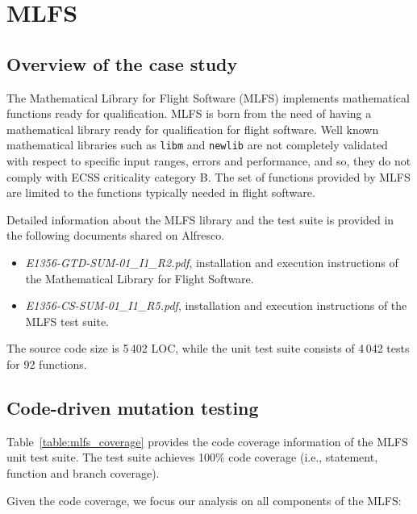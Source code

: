 \clearpage

\section{MLFS}
\label{sec:caseStudies:GSL:MLSF}

\subsection{Overview of the case study}

The Mathematical Library for Flight Software (MLFS) implements mathematical functions ready for qualification. 
MLFS is born from the need of having a mathematical library ready for qualification for flight software. Well known mathematical libraries such as \texttt{libm} and \texttt{newlib} are not completely validated with respect to specific input ranges, errors and performance, and so, they do not comply with ECSS criticality category B.
The set of functions provided by MLFS are limited to the functions typically needed in flight software. 

Detailed information about the MLFS library and the test suite is provided in the following documents shared on Alfresco.

\begin{itemize}
	\item \emph{E1356-GTD-SUM-01\_I1\_R2.pdf}, installation and execution instructions of the Mathematical Library for Flight Software. 
	\item \emph{E1356-CS-SUM-01\_I1\_R5.pdf}, installation and execution instructions of the MLFS test suite.
\end{itemize}

The source code size is 5\,402 LOC, while the unit test suite consists of 4\,042 tests for 92 functions.

\subsection{Code-driven mutation testing}



Table~\ref{table:mlfs_coverage} provides the code coverage information of the MLFS unit test suite. The test suite achieves 100\% code coverage (i.e., statement, function and branch coverage).

Given the code coverage, we focus our analysis on all components of the MLFS:


